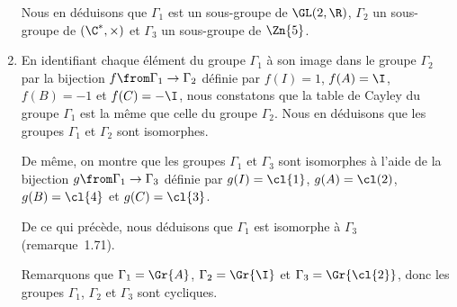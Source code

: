 \begin{enumerate}
  Nous en déduisons que $\Gamma_1$ est un sous-groupe de $\GL(2,\R)$, $\Gamma_2$ un sous-groupe de $(\C^*,\times)$ et $\Gamma_3$ un sous-groupe de $\Zn{5}$.

\item
  En identifiant chaque élément du groupe $\Gamma_1$ à son image dans le groupe $\Gamma_2$ par la bijection $f\from\Gamma_1\to\Gamma_2$ définie par $f(I) = 1$, $f(A) = \I$, $f(B) = -1$ et $f(C) = -\I$, nous constatons que la table de Cayley du groupe $\Gamma_1$ est la même que celle du groupe $\Gamma_2$.
  Nous en déduisons que les groupes $\Gamma_1$ et $\Gamma_2$ sont isomorphes.

  De même, on montre que les groupes $\Gamma_1$ et $\Gamma_3$ sont isomorphes à l'aide de la bijection $g\from\Gamma_1\to\Gamma_3$ définie par $g(I) = \cl{1}$, $g(A) = \cl(2)$, $g(B) = \cl{4}$ et $g(C) = \cl{3}$.
  
  De ce qui précède, nous déduisons que $\Gamma_1$ est isomorphe à $\Gamma_3$ (remarque~1.71).

  Remarquons que $\Gamma_1 = \Gr{A}$, $\Gamma_2 = \Gr{\I}$ et $\Gamma_3 = \Gr{\cl{2}}$, donc les groupes $\Gamma_1$, $\Gamma_2$ et $\Gamma_3$ sont cycliques.
\end{enumerate}
